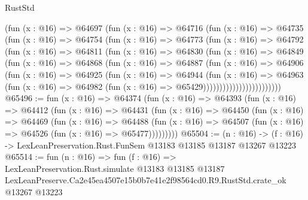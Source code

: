 \begin{lexlean}{RustStd}
\begin{coremodule}
                  (fun (x : @16) =>
                  @64697
                    (fun (x : @16) =>
                    @64716
                      (fun (x : @16) =>
                      @64735
                        (fun (x : @16) =>
                        @64754
                          (fun (x : @16) =>
                          @64773
                            (fun (x : @16) =>
                            @64792
                              (fun (x : @16) =>
                              @64811
                                (fun (x : @16) =>
                                @64830
                                  (fun (x : @16) =>
                                  @64849
                                    (fun (x : @16) =>
                                    @64868
                                      (fun (x : @16) =>
                                      @64887
                                        (fun (x : @16) =>
                                        @64906
                                          (fun (x : @16) =>
                                          @64925
                                            (fun (x : @16) =>
                                            @64944
                                              (fun (x : @16) =>
                                              @64963
                                                (fun (x : @16) =>
                                                @64982
                                                  (fun (x : @16) => @65429))))))))))))))))))))))))
@65496 := fun (x : @16) =>
  @64374
    (fun (x : @16) =>
    @64393
      (fun (x : @16) =>
      @64412
        (fun (x : @16) =>
        @64431
          (fun (x : @16) =>
          @64450
            (fun (x : @16) =>
            @64469
              (fun (x : @16) =>
              @64488
                (fun (x : @16) => @64507 (fun (x : @16) => @64526 (fun (x : @16) => @65477)))))))))
@65504 := (n : @16) ->
  (f : @16) -> LexLeanPreservation.Rust.FunSem @13183 @13185 @13187 @13267 @13223
@65514 := fun (n : @16) =>
  fun (f : @16) =>
  LexLeanPreservation.Rust.simulate
    @13183
    @13185
    @13187
    LexLeanPreserve.Ca2e45ea4507e15b0b7e41e2f98564cd0.R9.RustStd.crate_ok
    @13267
    @13223
\end{coremodule}
\end{lexlean}
